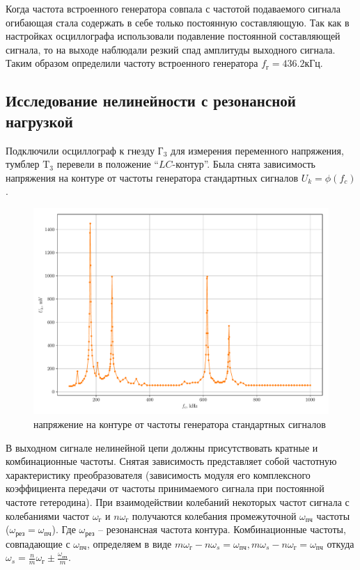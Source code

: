 Когда частота встроенного генератора совпала с частотой подаваемого сигнала огибающая стала содержать в себе только постоянную составляющую. Так как в настройках осциллографа использовали подавление постоянной составляющей сигнала, то на выходе наблюдали резкий спад амплитуды выходного сигнала. Таким образом определили частоту встроенного генератора $f_\text{г}=436.2\text{кГц}$.
\subsection{Исследование нелинейности с резонансной нагрузкой}
Подключили осциллограф к гнезду $\text{Г}_3$ для измерения переменного напряжения,
тумблер $\text{T}_3$ перевели в положение “$LC$-контур”.
Была снята зависимость напряжения на контуре от частоты генератора стандартных сигналов $U_k=\phi(f_c)$.
\begin{figure}[h!]
	\centering
	\includegraphics[width=\textwidth]{plots/exp2.pdf}
	\caption{напряжение на контуре от частоты генератора стандартных сигналов}
	\label{exp:2}
\end{figure}

В выходном сигнале нелинейной цепи должны присутствовать кратные и комбинационные частоты. Снятая зависимость представляет собой частотную характеристику преобразователя (зависимость модуля его комплексного коэффициента передачи от частоты принимаемого сигнала при постоянной частоте гетеродина). При взаимодействии колебаний некоторых
частот сигнала с колебаниями частот $\omega_{\text{г}}$ и $n\omega_{\text{г}}$ получаются колебания промежуточной
$\omega_{\text{пч}}$ частоты ($\omega_{\text{рез}} = \omega_{\text{пч}}$). Где $\omega_{\text{рез}}$ -- резонансная частота контура. Комбинационные частоты, совпадающие с $\omega_{\text{пч}}$, определяем в
виде $m\omega_{\text{г}} - n\omega_s = \omega_{\text{пч}}, m\omega_s - n\omega_{\text{г}} = \omega_{\text{пч}}$ откуда $\omega_s =\frac{n}{m}\omega_{\text{г}}\pm\frac{\omega_{\text{пч}}}{m}$.

